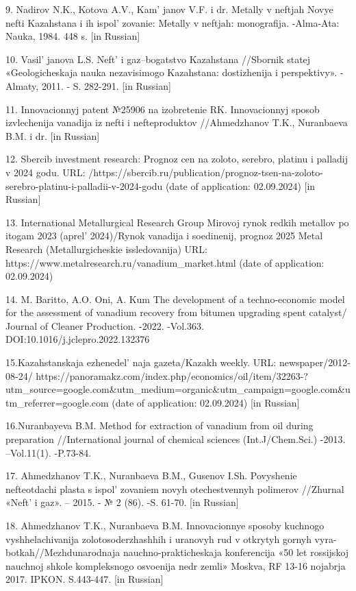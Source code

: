 \begin{references}
9. Nadirov N.K., Kotova A.V., Kam' janov V.F. i dr.
Metally v neftjah Novye nefti Kazahstana i ih
ispol' zovanie: Metally v neftjah: monografija.
-Alma-Ata: Nauka, 1984. 448 s. {[}in Russian{]}

10. Vasil' janova L.S. Neft'{} i
gaz--bogatstvo Kazahstana //Sbornik statej «Geologicheskaja nauka
nezavisimogo Kazahstana: dostizhenija i perspektivy». -Almaty, 2011. -
S. 282-291. {[}in Russian{]}

11. Innovacionnyj patent №25906 na izobretenie RK. Innovacionnyj sposob
izvlechenija vanadija iz nefti i nefteproduktov //Ahmedzhanov T.K.,
Nuranbaeva B.M. i dr. {[}in Russian{]}

12. Sbercib investment research: Prognoz cen na zoloto, serebro, platinu
i palladij v 2024 godu. URL:
/https://sbercib.ru/publication/prognoz-tsen-na-zoloto-serebro-platinu-i-palladii-v-2024-godu
(date of application: 02.09.2024) {[}in Russian{]}

13. International Metallurgical Research Group Mirovoj rynok redkih
metallov po itogam 2023 (aprel'{} 2024)/Rynok vanadija i
soedinenij, prognoz 2025 Metal Research (Metallurgicheskie
issledovanija) URL: https://www.metalresearch.ru/vanadium\_market.html
(date of application: 02.09.2024)

14. M. Baritto, A.O. Oni, A. Kum The development of a techno-economic
model for the assessment of vanadium recovery from bitumen upgrading
spent catalyst/ Journal of Cleaner Production. -2022. -Vol.363.
DOI:10.1016/j.jclepro.2022.132376

15.Kazahstanskaja ezhenedel' naja gazeta/Kazakh weekly.
URL: newspaper/2012-08-24/
https://panoramakz.com/index.php/economics/oil/item/32263-?utm\_source=google.com\&utm\_medium=organic\&utm\_campaign=google.com\&utm\_referrer=google.com
(date of application: 02.09.2024) {[}in Russian{]}

16.Nuranbayeva B.M. Method for extraction of vanadium from oil during
preparation //International journal of chemical sciences
(Int.J/Chem.Sci.) -2013. --Vol.11(1). -P.73-84.

17. Ahmedzhanov T.K., Nuranbaeva B.M., Gusenov I.Sh. Povyshenie
nefteotdachi plasta s ispol' zovaniem novyh
otechestvennyh polimerov //Zhurnal «Neft'{} i gaz». --
2015. - № 2 (86). -S. 61-70. {[}in Russian{]}

18. Ahmedzhanov T.K., Nuranbaeva B.M. Innovacionnye sposoby kuchnogo
vyshhelachivanija zolotosoderzhashhih i uranovyh rud v otkrytyh gornyh
vyra-botkah//Mezhdunarodnaja nauchno-prakticheskaja konferencija «50 let
rossijskoj nauchnoj shkole kompleksnogo osvoenija nedr zemli» Moskva, RF
13-16 nojabrja 2017. IPKON. S.443-447. {[}in Russian{]}


\end{references}
